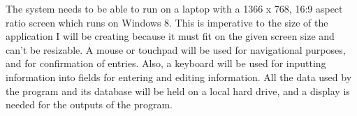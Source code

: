 The system needs to be able to run on a laptop with a 1366 x 768, 16:9 aspect ratio screen which runs on Windows 8. This is imperative to the size of the application I will be creating because it must fit on the given screen size and can't be resizable. A mouse or touchpad will be used for navigational purposes, and for confirmation of entries. Also, a keyboard will be used for inputting information into fields for entering and editing information. All the data used by the program and its database will be held on a local hard drive, and a display is needed for the outputs of the program.
%
%
%
%
%
%
%
%
%
%
%
%


